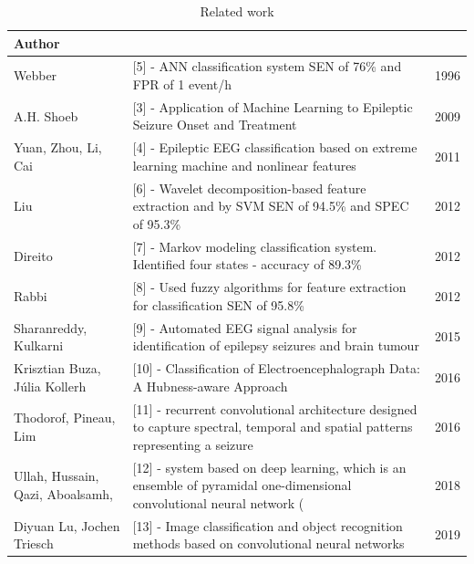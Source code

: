 \documentclass{llncs}       %
\begin{document}
\begin{table}[h!]
\begin{tabular}{ |p{1.8cm}|p{10cm}|p{1.0cm}|  }

 \hline
 Author     & & \\
 \hline
 Webber &  $[$5$]$ - ANN classification system SEN of 76\% and FPR of 1 event/h &1996 \\
 A.H. Shoeb &  $[$3$]$ -  Application of Machine Learning to Epileptic Seizure Onset and
Treatment&2009 \\
 Yuan, Zhou, Li, Cai &  $[$4$]$ - Epileptic EEG classification based on extreme learning machine and nonlinear features &2011 \\

 Liu&  $[$6$]$ - Wavelet decomposition-based feature extraction  and by SVM  SEN of 94.5\% and SPEC of 95.3\% & 2012 \\

Direito& $[$7$]$ - Markov modeling classification system. Identified four states - accuracy of 89.3\% & 2012 \\
Rabbi& $[$8$]$ - Used fuzzy algorithms for feature extraction for classification SEN of 95.8\%  & 2012 \\

Sharanreddy, Kulkarni& $[$9$]$ - Automated EEG signal analysis for identification of epilepsy seizures and brain tumour  & 2015 \\

Krisztian Buza, Júlia Kollerh& $[$10$]$ - Classification of Electroencephalograph Data:
A Hubness-aware Approach  & 2016 \\

Thodorof, Pineau, Lim& $[$11$]$ - recurrent convolutional architecture designed to capture spectral, temporal and spatial patterns representing a seizure  & 2016 \\

Ullah, Hussain, Qazi, Aboalsamh, & $[$12$]$ -  system based on deep learning, which is an ensemble of pyramidal one-dimensional convolutional neural network (  & 2018 \\

Diyuan Lu, Jochen Triesch& $[$13$]$ - Image classification and object recognition methods based on convolutional neural networks  & 2019 \\



 \hline
\end{tabular}
\caption{ Related work}
\end{table}
\end{document}
